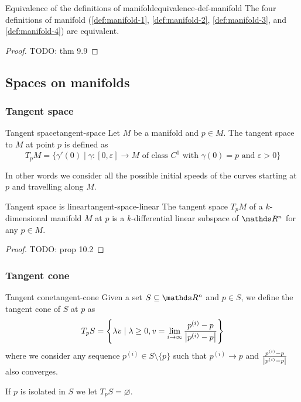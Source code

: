 \documentclass[12pt]{extarticle}
\begin{document}
\begin{theorem}{Equivalence of the definitions of manifold}{equivalence-def-manifold}
	The four definitions of manifold (\cref{def:manifold-1}, \cref{def:manifold-2},
	\cref{def:manifold-3}, and \cref{def:manifold-4}) are equivalent.
\end{theorem}
\begin{proof}
	TODO: thm 9.9
\end{proof}

\subsection{Spaces on manifolds}
\subsubsection{Tangent space}

\begin{definition}{Tangent space}{tangent-space}
	Let $M$ be a manifold and $p \in M$. The tangent space to $M$ at point $p$ is defined as
	\begin{equation}
		T_p M = \{ \gamma'(0) \mid \gamma: [0, \varepsilon] \to M \text{ of class } C^1 \text{ with }
		\gamma(0) = p \text{ and } \varepsilon > 0 \}
	\end{equation}
\end{definition}
In other words we consider all the possible initial speeds of the curves starting at $p$ and
travelling along $M$.

\begin{proposition}{Tangent space is linear}{tangent-space-linear}
	The tangent space $T_p M$ of a $k$-dimensional manifold $M$ at $p$ is a $k$-differential linear
	subspace of $\R^n$ for any $p \in M$.
\end{proposition}

\begin{proof}
	TODO: prop 10.2
\end{proof}

\subsubsection{Tangent cone}

\begin{definition}{Tangent cone}{tangent-cone}
	Given a set $S \subseteq \R^n$ and $p \in S$, we define the tangent cone of $S$ at $p$ as
	\begin{equation}
		T_p S = \left\{ \lambda v \mid \lambda \geq 0,
		v = \lim_{i \to \infty} \frac{p^{(i)} - p}{\abs{p^{(i)} - p}}\right\}
	\end{equation}
	where we consider any sequence $p^{(i)} \in S \setminus \{p\}$ such that $p^{(i)} \to p$ and
	$\frac{p^{(i)} - p}{\abs{p^{(i)} - p}}$ also converges.

	If $p$ is isolated in $S$ we let $T_p S = \varnothing$.
\end{definition}
\end{document}
